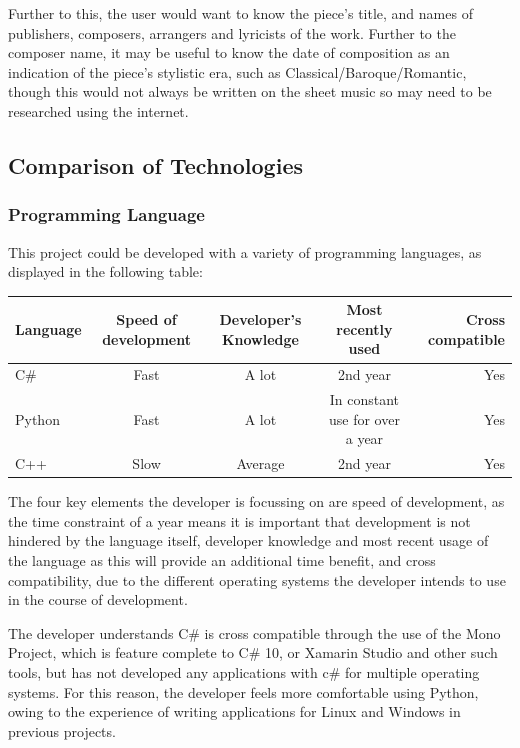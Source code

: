 Further to this, the user would want to know the piece's title, and names of publishers, composers, arrangers and lyricists of the work. Further to the composer name, it may be useful to know the date of composition as an indication of the piece's stylistic era, such as Classical/Baroque/Romantic, though this would not always be written on the sheet music so may need to be researched using the internet.


\subsection{Comparison of Technologies}
\subsubsection{Programming Language}
This project could be developed with a variety of programming languages, as displayed in the following table:

\begin{center}
\begin{tabular}{| l | c | c | c | r |} \hline
  {Language} & {Speed of development} & {Developer's Knowledge} & {Most recently used} & {Cross compatible} \\ \hline
  C\# & Fast & A lot & 2nd year & Yes \\ \hline
  Python & Fast & A lot & In constant use for over a year & Yes \\ \hline
  C++ & Slow & Average & 2nd year & Yes \\ \hline
\end{tabular}
\end{center}
The four key elements the developer is focussing on are speed of development, as the time constraint of a year means it is important that development is not hindered by the language itself, developer knowledge and most recent usage of the language as this will provide an additional time benefit, and cross compatibility, due to the different operating systems the developer intends to use in the course of development.

The developer understands C\# is cross compatible through the use of the Mono Project, which is feature complete to C\# 10\parencite{MonoDev}, or Xamarin Studio and other such tools, but has not developed any applications with c\# for multiple operating systems. For this reason, the developer feels more comfortable using Python, owing to the experience of writing applications for Linux and Windows in previous projects. 

